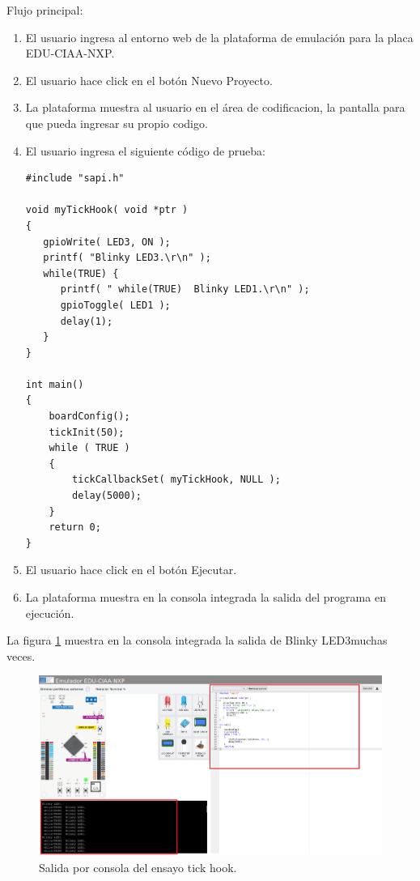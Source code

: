 Flujo principal:
\begin{enumerate}
	\item El usuario ingresa al entorno web de la plataforma de emulación para la placa EDU-CIAA-NXP.
	\item El usuario hace click en el botón \textquotedbl Nuevo Proyecto\textquotedbl.
	\item La plataforma muestra al usuario en el área de codificacion, la pantalla para que pueda ingresar su propio codigo.
	\item El usuario ingresa el siguiente código de prueba:
	
\begin{lstlisting}[caption={nuevo proyecto}]
#include "sapi.h"

void myTickHook( void *ptr )
{
   gpioWrite( LED3, ON );
   printf( "Blinky LED3.\r\n" );
   while(TRUE) {
      printf( " while(TRUE)  Blinky LED1.\r\n" );
      gpioToggle( LED1 );
      delay(1);
   }
}

int main()
{
    boardConfig();
    tickInit(50);
    while ( TRUE )
    {
		tickCallbackSet( myTickHook, NULL );
		delay(5000);
    }
    return 0;
}
\end{lstlisting}

	\item El usuario hace click en el botón \textquotedbl Ejecutar\textquotedbl.
	\item La plataforma muestra en la consola integrada la salida del programa en ejecución.
	
\end{enumerate}
	

La figura \ref{fig:Testtickhook} muestra en la consola integrada la salida de \textquotedbl Blinky LED3\textquotedbl muchas veces. 


\begin{figure}[ht]
	\centering
	\includegraphics[scale=.20]{./Figures/Testtickhook.png}
	\caption{Salida por consola del ensayo tick hook.}
	\label{fig:Testtickhook}
\end{figure}


